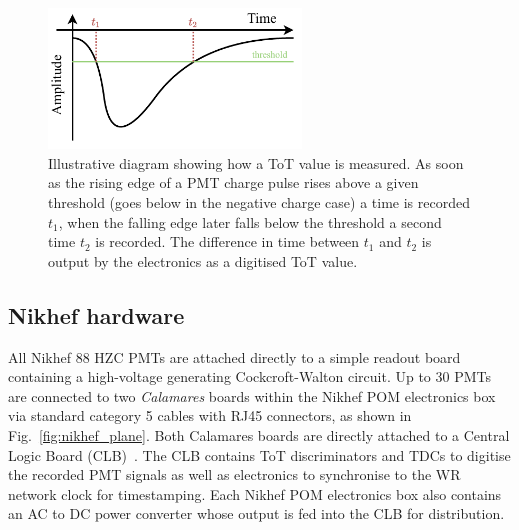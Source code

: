 \begin{figure} %
    \includegraphics[width=0.6\textwidth]{diagrams/5-daq/tot.pdf}
    \caption[Illustrative diagram showing how Time over Threshold is measured.]
    {Illustrative diagram showing how a ToT value is measured. As soon as the rising edge of a PMT
        charge pulse rises above a given threshold (goes below in the negative charge case) a time
        is recorded $t_{1}$, when the falling edge later falls below the threshold a second time
        $t_{2}$ is recorded. The difference in time between $t_{1}$ and $t_{2}$ is output by the
        electronics as a digitised ToT value.}
    \label{fig:tot}
\end{figure}

\subsection{Nikhef hardware} %
\label{sec:daq_hard_Nikhed} %

All Nikhef \unit{88}{} HZC PMTs are attached directly to a simple readout board
containing a high-voltage generating Cockcroft-Walton circuit. Up to 30 PMTs are connected to two
\emph{Calamares} boards within the Nikhef POM electronics box via standard category 5 cables with
RJ45 connectors, as shown in Fig.~\ref{fig:nikhef_plane}. Both Calamares boards are directly
attached to a Central Logic Board (CLB)~\cite{biagi2015, eijk2015}. The CLB contains ToT
discriminators and TDCs to digitise the recorded PMT signals as well as electronics to synchronise
to the WR network clock for timestamping. Each Nikhef POM electronics box also contains an AC to
DC power converter whose output is fed into the CLB for distribution.


